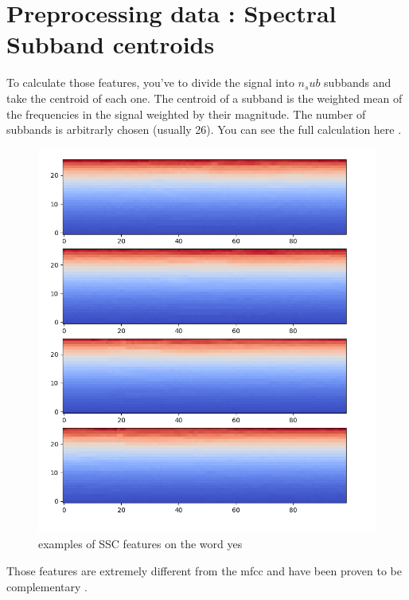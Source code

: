 \section{Preprocessing data : Spectral Subband centroids}

To calculate those features, you've to divide the signal into $n_sub$ subbands and take the centroid of each one. The centroid of a subband is the weighted mean of the frequencies in the signal weighted by their magnitude. The number of subbands is arbitrarly chosen (usually 26). You can see the full calculation here \cite{subband}.

\newpage

\begin{figure}[!h]
    \centering
    \includegraphics[width=1\textwidth]{chapters/pictures/ssc_yes.PNG}
    \caption{examples of SSC features on the word yes}
    \label{fig:mfcc_yes}
\end{figure}

Those features are extremely different from the mfcc and have been proven to be complementary \cite{subband_comp}. 